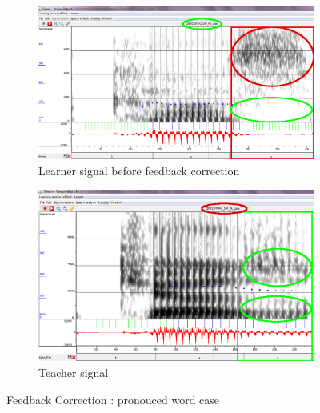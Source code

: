 \documentclass[11pt]{beamer}
\begin{document}
\begin{frame}

\begin{figure}
\begin{subfigure}{.5\textwidth}
  \centering
  \includegraphics[width=0.9\linewidth]{images/case_learner-changed2.PNG}
  \caption{Learner signal before feedback correction}
  \label{fig:sfig1}
\end{subfigure}%
\begin{subfigure}{.5\textwidth}
  \centering
  \includegraphics[width=0.9\linewidth]{images/teacher_case_changed2.PNG}
  \caption{Teacher signal}
  \label{fig:sfig2}
\end{subfigure}
\caption{Feedback Correction : pronouced word case}
\label{fig:fig}
\end{figure}
\end{frame}
\end{document}
